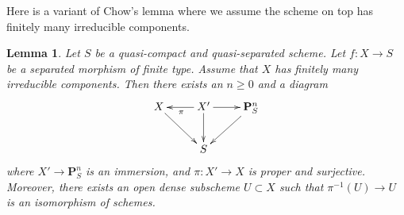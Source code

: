 \documentclass{stacks-project}
\theoremstyle{plain}
\newtheorem{lemma}[subsection]{Lemma}
\theoremstyle{definition}
\theoremstyle{remark}
\numberwithin{equation}{subsection}
\begin{document}
\noindent
Here is a variant of Chow's lemma where we assume the scheme
on top has finitely many irreducible components.

\begin{lemma}
\label{lemma-chow-EGA}
Let $S$ be a quasi-compact and quasi-separated scheme.
Let $f : X \to S$ be a separated morphism of finite type.
Assume that $X$ has finitely many irreducible components.
Then there exists an $n \geq 0$ and a diagram
$$
\xymatrix{
X \ar[rd] & X' \ar[d] \ar[l]^\pi \ar[r] & \mathbf{P}^n_S \ar[dl] \\
& S &
}
$$
where $X' \to \mathbf{P}^n_S$ is an immersion, and
$\pi : X' \to X$ is proper and surjective. Moreover, there exists
an open dense subscheme $U \subset X$ such that $\pi^{-1}(U) \to U$
is an isomorphism of schemes.
\end{lemma}
\end{document}
